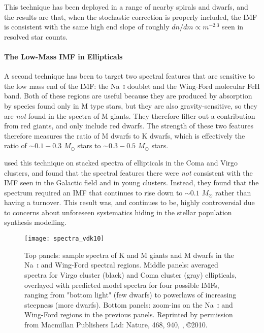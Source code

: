 This technique has been deployed in a range of nearby spirals and dwarfs, and the results are that, when the stochastic correction is properly included, the IMF is consistent with the same high end slope of roughly $dn/dm\propto m^{-2.3}$ seen in resolved star counts.

\paragraph{The Low-Mass IMF in Ellipticals} A second technique has been to target two spectral features that are sensitive to the low mass end of the IMF: the Na~\textsc{i} doublet and the Wing-Ford molecular FeH band. Both of these regions are useful because they are produced by absorption by species found only in M type stars, but they are also gravity-sensitive, so they are \textit{not} found in the spectra of M giants. They therefore filter out a contribution from red giants, and only include red dwarfs. The strength of these two features therefore measures the ratio of M dwarfs to K dwarfs, which is effectively the ratio of $\sim 0.1-0.3$ $M_\odot$ stars to $\sim 0.3-0.5$ $M_\odot$ stars.

\citet{van-dokkum10a} used this technique on stacked spectra of ellipticals in the Coma and Virgo clusters, and found that the spectral features there were \textit{not} consistent with the IMF seen in the Galactic field and in young clusters. Instead, they found that the spectrum required an IMF that continues to rise down to $\sim 0.1$ $M_\odot$ rather than having a turnover. This result was, and continues to be, highly controversial due to concerns about unforeseen systematics hiding in the stellar population synthesis modelling.

\begin{figure}
\texttt{[image: spectra\_vdk10]}
\caption[Elliptical galaxy spectra in the Na~\textsc{i} and Wing-Ford regions]{
\label{fig:spectra_vdk10}
Top panels: sample spectra of K and M giants and M dwarfs in the Na~\textsc{i} and Wing-Ford spectral regions. Middle panels: averaged spectra for Virgo cluster (black) and Coma cluster (gray) ellipticals, overlayed with predicted model spectra for four possible IMFs, ranging from "bottom light" (few dwarfs) to powerlaws of increasing steepness (more dwarfs). Bottom panels: zoom-ins on the Na~\textsc{i} and Wing-Ford regions in the previous panels. Reprinted by permission from Macmillan Publishers Ltd:
Nature, 468, 940, \citeauthor{van-dokkum10a}, \copyright 2010.
}
\end{figure}

